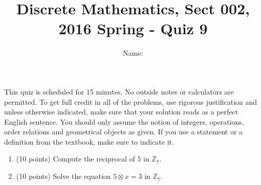 \documentclass[11pt]{preprint}
\title{Discrete Mathematics, Sect 002, 2016 Spring - Quiz 9}
\author{Name:}
\institute{Courant Institute of Mathematical Sciences, NYU}
\begin{document}
\maketitle

This quiz is scheduled for 15 minutes. No outside notes or calculators are permitted. To get full credit  in all of the problems, use rigorous justification and unless otherwise indicated, make sure that your solution reads as a perfect English sentence. You should only assume the notion of integers, operations, order relations and geometrical objects as given. If you use a statement or a definition from the textbook, make sure to indicate it.
\vspace{0.2cm}

\begin{enumerate}
\item(10 points) Compute the reciprocal of $5$ in $\mathbb{Z}_7$.

\vspace{7cm}
\item (10 points)  Solve the equation $5\otimes x=3$ in $\mathbb{Z}_7$.
\end{enumerate}
\end{document}
